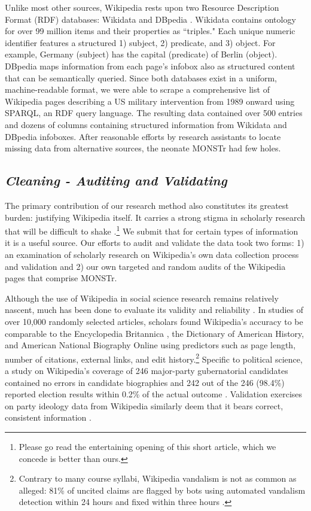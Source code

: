 \documentclass[fleqn,12pt]{article}
\begin{document}
Unlike most other sources, Wikipedia rests upon two Resource Description Format (RDF) databases: Wikidata and DBpedia \citep{Malyshev18}. Wikidata contains ontology for over 99 million items and their properties as ``triples." Each unique numeric identifier features a structured 1) subject, 2) predicate, and 3) object. For example, Germany (subject) has the capital (predicate) of Berlin (object). DBpedia maps information from each page's infobox also as structured content that can be semantically queried. Since both databases exist in a uniform, machine-readable format, we were able to scrape a comprehensive list of Wikipedia pages describing a US military intervention from 1989 onward using SPARQL, an RDF query language. The resulting data contained over 500 entries and dozens of columns containing structured information from Wikidata and DBpedia infoboxes. After reasonable efforts by research assistants to locate missing data from alternative sources, the neonate MONSTr had few holes.

\subsection*{\textit{Cleaning - Auditing and Validating}}
The primary contribution of our research method also constitutes its greatest burden: justifying Wikipedia itself. It carries a strong stigma in scholarly research that will be difficult to shake \citep{Becker15}.\footnote{Please go read the entertaining opening of this short article, which we concede is better than ours.} We submit that for certain types of information it is a useful source. Our efforts to audit and validate the data took two forms: 1) an examination of scholarly research on Wikipedia's own data collection process and validation and 2) our own targeted and random audits of the Wikipedia pages that comprise MONSTr.

Although the use of Wikipedia in social science research remains relatively nascent, much has been done to evaluate its validity and reliability \citep{GreensteinZhu12,Mesgari15,BenjakobAviram18}. In studies of over 10,000 randomly selected articles, scholars found Wikipedia’s accuracy to be comparable to the Encyclopedia Britannica \citep{Blumenstock08}, the Dictionary of American History, and American National Biography Online \citep{Rector08} using predictors such as page length, number of citations, external links, and edit history.\footnote{Contrary to many course syllabi, Wikipedia vandalism is not as common as alleged: 81\% of uncited claims are flagged by bots using automated vandalism detection within 24 hours and fixed within three hours \citep{Adler11,Tramullas16}.} Specific to political science, a study on Wikipedia’s coverage of 246 major-party gubernatorial candidates contained no errors in candidate biographies and 242 out of the 246 (98.4\%) reported election results within 0.2\% of the actual outcome \citep{Brown11}. Validation exercises on party ideology data from Wikipedia similarly deem that it bears correct, consistent information \citep{GobelMunzert21, HerrmannDoring21}.
\end{document}
